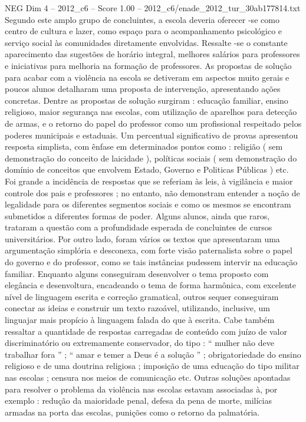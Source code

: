\begin{textsample}{NEG Dim 4 – 2012\_c6 – Score 1.00 – 2012\_c6/enade\_2012\_tur\_30ab177814.txt}
Segundo este amplo grupo de concluintes, a escola deveria oferecer -se como centro de cultura e lazer, como espaço para o acompanhamento psicológico e serviço social às comunidades diretamente envolvidas.
Ressalte -se o constante aparecimento das sugestões de horário integral, melhores salários para professores e iniciativas para melhoria na formação de professores.
As propostas de solução para acabar com a violência na escola se detiveram em aspectos muito gerais e poucos alunos detalharam uma proposta de intervenção, apresentando ações concretas.
Dentre as propostas de solução surgiram : educação familiar, ensino religioso, maior segurança nas escolas, com utilização de aparelhos para detecção de armas, e o retorno do papel do professor como um profissional respeitado pelos poderes municipais e estaduais.
Um percentual significativo de provas apresentou resposta simplista, com ênfase em determinados pontos como : religião ( sem demonstração do conceito de laicidade ), políticas sociais ( sem demonstração do domínio de conceitos que envolvem Estado, Governo e Politicas Públicas ) etc.
Foi grande a incidência de respostas que se referiam às leis, à vigilância e maior controle dos pais e professores ; no entanto, não demonstram entender a noção de legalidade para os diferentes segmentos sociais e como os mesmos se encontram submetidos a diferentes formas de poder.
Alguns alunos, ainda que raros, trataram a questão com a profundidade esperada de concluintes de cursos universitários.
Por outro lado, foram vários os textos que apresentaram uma argumentação simplória e desconexa, com forte visão paternalista sobre o papel do governo e do professor, como se tais instâncias pudessem intervir na educação familiar.
Enquanto alguns conseguiram desenvolver o tema proposto com elegância e desenvoltura, encadeando o tema de forma harmônica, com excelente nível de linguagem escrita e correção gramatical, outros sequer conseguiram conectar as ideias e construir um texto razoável, utilizando, inclusive, um linguajar mais propício à linguagem falada do que à escrita.
Cabe também ressaltar a quantidade de respostas carregadas de conteúdo com juízo de valor discriminatório ou extremamente conservador, do tipo : “ mulher não deve trabalhar fora ” ; “ amar e temer a Deus é a solução ” ; obrigatoriedade do ensino religioso e de uma doutrina religiosa ; imposição de uma educação do tipo militar nas escolas ; censura nos meios de comunicação etc.
Outras soluções apontadas para resolver o problema da violência nas escolas estavam associadas à, por exemplo : redução da maioridade penal, defesa da pena de morte, milícias armadas na porta das escolas, punições como o retorno da palmatória.

\end{textsample}
